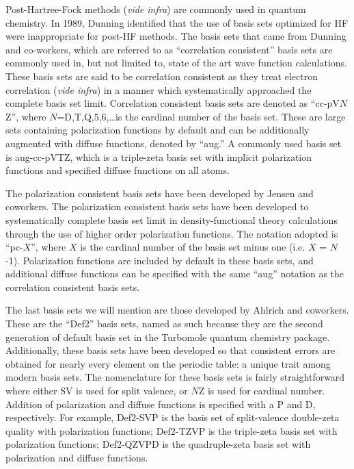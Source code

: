 \vspace{3mm}
\vspace{1mm}

Post-Hartree-Fock methods (\emph{vide infra}) are commonly used in quantum chemistry. In 1989, Dunning\cite{Dunning1989} identified that the use of basis sets optimized for HF were inappropriate for post-HF methods. The basis sets that came from Dunning and co-workers, which are referred to as ``correlation consistent'' basis sets are commonly used in, but not limited to, state of the art wave function calculations. These basis sets are said to be correlation consistent as they treat electron correlation (\emph{vide infra}) in a manner which systematically approached the complete basis set limit. Correlation consistent basis sets are denoted as ``cc-pV$N$Z'', where $N$=D,T,Q,5,6,\ldots is the cardinal number of the basis set. These are large sets containing polarization functions by default and can be additionally augmented with diffuse functions, denoted by ``aug.'' A commonly used basis set is aug-cc-pVTZ, which is a triple-zeta basis set with implicit polarization functions and specified diffuse functions on all atoms.

\vspace{3mm}
\vspace{1mm}

The polarization consistent basis sets have been developed by Jensen and coworkers.\cite{Jensen2001} The polarization consistent basis sets have been developed to systematically complete basis set limit in density-functional theory calculations through the use of higher order polarization functions. The notation adopted is ``pc-$X$'', where $X$ is the cardinal number of the basis set minus one (i.e. $X$ = $N$-1). Polarization functions are included by default in these basis sets, and additional diffuse functions can be specified with the same ``aug'' notation as the correlation consistent basis sets.

\vspace{3mm}
\vspace{1mm}

The last basis sets we will mention are those developed by Ahlrich and coworkers.\cite{Schafer1992,Weigend2005} These are the ``Def2'' basis sets, named as such because they are the second generation of default basis set in the Turbomole quantum chemistry package.\cite{turbomole} Additionally, these basis sets have been developed so that consistent errors are obtained for nearly every element on the periodic table: a unique trait among modern basis sets. The nomenclature for these basis sets is fairly straightforward where either SV is used for split valence, or $N$Z is used for cardinal number. Addition of polarization and diffuse functions is specified with a P and D, respectively. For example, Def2-SVP is the basis set of split-valence double-zeta quality with polarization functions; Def2-TZVP is the triple-zeta basis set with polarization functions; Def2-QZVPD is the quadruple-zeta basis set with polarization and diffuse functions.

